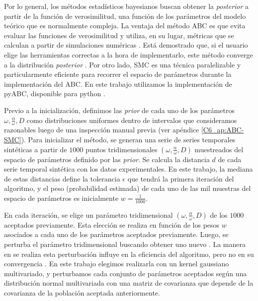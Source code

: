 \documentclass[./main.tex]{subfiles}
\begin{document}
Por lo general, los métodos estadísticos bayesianos buscan obtener la \textit{posterior} a partir de la función de verosimilitud, una función de los parámetros del modelo teórico que es normalmente compleja. La ventaja del método ABC es que evita evaluar las funciones de verosimilitud y utiliza, en su lugar, métricas que se calculan a partir de simulaciones numéricas \cite{Csillery2010}. Está demostrado que, si el usuario elige las herramientas correctas a la hora de implementarlo, este método converge a la distribución \textit{posterior} \cite{Csillery2010,Filippi2013}. Por otro lado, SMC es una técnica paralelizable y particularmente eficiente para recorrer el espacio de parámetros durante la implementación del ABC. En este trabajo utilizamos la implementación de pyABC, disponible para python \cite{Klinger2018}.

Previo a la inicialización, definimos las \textit{prior} de cada uno de los parámetros $\omega,\frac{\alpha}{\omega},D$ como distribuciones uniformes dentro de intervalos que consideramos razonables luego de una inspección manual previa \cite{Toni2010} (ver apéndice \ref{C6_ap:ABC-SMC}). Para inicializar el método, se generan una serie de series temporales sintéticas a partir de $1000$ puntos tridimensionales $(\omega,\frac{\alpha}{\omega},D)$ muestreados del espacio de parámetros definido por las \textit{prior}. Se calcula la distancia $d$ de cada serie temporal sintética con los datos experimentales. En este trabajo, la mediana de estas distancias define la tolerancia $\epsilon$ que tendrá la primera iteración del algoritmo, y el peso (probabilidad estimada) de cada uno de las mil muestras del espacio de parámetros es inicialmente $w = \frac{1}{1000}$. 


En cada iteración, se elige un parámetro tridimensional $(\omega,\frac{\alpha}{\omega},D)$ de los $1000$ aceptados previamente. Esta elección se realiza en función de los pesos $w$ asociados a cada uno de los parámetros aceptados previamente. Luego, se perturba el parámetro tridimensional buscando obtener uno nuevo \cite{Toni2009}. La manera en se realiza esta perturbación influye en la eficiencia del algoritmo, pero no en su convergencia \cite{Filippi2013}. En este trabajo elegimos realizarla con un kernel gaussiano multivariado, y perturbamos cada conjunto de parámetros aceptados según una distribución normal multivariada con una matriz de covarianza que depende de la covarianza de la población aceptada anteriormente.
\end{document}
